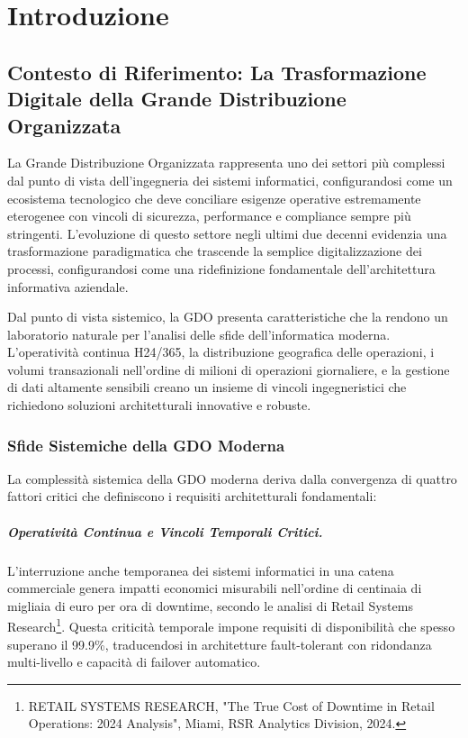 \documentclass[12pt,a4paper,oneside]{book}
\begin{document}


\chapter{Introduzione}
\label{chap:introduzione}

\section{Contesto di Riferimento: La Trasformazione Digitale della Grande Distribuzione Organizzata}
\label{sec:contesto}

La Grande Distribuzione Organizzata rappresenta uno dei settori più complessi dal punto di vista dell'ingegneria dei sistemi informatici, configurandosi come un ecosistema tecnologico che deve conciliare esigenze operative estremamente eterogenee con vincoli di sicurezza, performance e compliance sempre più stringenti. L'evoluzione di questo settore negli ultimi due decenni evidenzia una trasformazione paradigmatica che trascende la semplice digitalizzazione dei processi, configurandosi come una ridefinizione fondamentale dell'architettura informativa aziendale.

Dal punto di vista sistemico, la GDO presenta caratteristiche che la rendono un laboratorio naturale per l'analisi delle sfide dell'informatica moderna. L'operatività continua H24/365, la distribuzione geografica delle operazioni, i volumi transazionali nell'ordine di milioni di operazioni giornaliere, e la gestione di dati altamente sensibili creano un insieme di vincoli ingegneristici che richiedono soluzioni architetturali innovative e robuste.

\subsection{Sfide Sistemiche della GDO Moderna}
\label{ssec:sfide_sistemiche}

La complessità sistemica della GDO moderna deriva dalla convergenza di quattro fattori critici che definiscono i requisiti architetturali fondamentali:

\paragraph{Operatività Continua e Vincoli Temporali Critici.} L'interruzione anche temporanea dei sistemi informatici in una catena commerciale genera impatti economici misurabili nell'ordine di centinaia di migliaia di euro per ora di downtime, secondo le analisi di Retail Systems Research\footnote{RETAIL SYSTEMS RESEARCH, "The True Cost of Downtime in Retail Operations: 2024 Analysis", Miami, RSR Analytics Division, 2024.}. Questa criticità temporale impone requisiti di disponibilità che spesso superano il 99.9\%, traducendosi in architetture fault-tolerant con ridondanza multi-livello e capacità di failover automatico.
\end{document}

